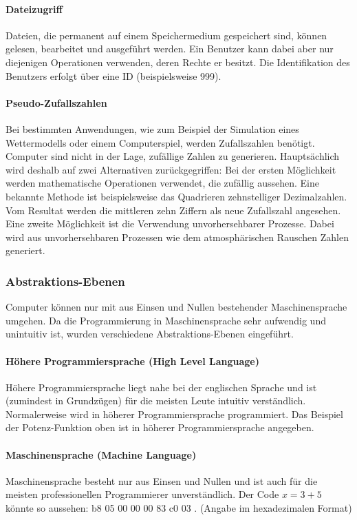 \documentclass[11pt, a4paper]{article}
\begin{document}
\paragraph{Dateizugriff}
Dateien, die permanent auf einem Speichermedium gespeichert sind, können gelesen, bearbeitet und ausgeführt werden. Ein Benutzer kann dabei aber nur diejenigen Operationen verwenden, deren Rechte er besitzt. Die Identifikation des Benutzers erfolgt über eine ID (beispielsweise 999).

\paragraph{Pseudo-Zufallszahlen}
Bei bestimmten Anwendungen, wie zum Beispiel der Simulation eines Wettermodells oder einem Computerspiel, werden Zufallszahlen benötigt. Computer sind nicht in der Lage, zufällige Zahlen zu generieren. Hauptsächlich wird deshalb auf zwei Alternativen zurückgegriffen: Bei der ersten Möglichkeit werden mathematische Operationen verwendet, die zufällig aussehen. Eine bekannte Methode ist beispielsweise das Quadrieren zehnstelliger Dezimalzahlen. Vom Resultat werden die mittleren zehn Ziffern als neue Zufallszahl angesehen. Eine zweite Möglichkeit ist die Verwendung unvorhersehbarer Prozesse. Dabei wird aus unvorhersehbaren Prozessen wie dem atmosphärischen Rauschen Zahlen generiert.~\cite{Mathemat11:online}

\subsubsection{Abstraktions-Ebenen}
Computer können nur mit aus Einsen und Nullen bestehender Maschinensprache umgehen. Da die Programmierung in Maschinensprache sehr aufwendig und unintuitiv ist, wurden verschiedene Abstraktions-Ebenen eingeführt.

\paragraph{Höhere Programmiersprache (High Level Language)}
Höhere Programmiersprache liegt nahe bei der englischen Sprache und ist (zumindest in Grundzügen) für die meisten Leute intuitiv verständlich. Normalerweise wird in höherer Programmiersprache programmiert. Das Beispiel der Potenz-Funktion oben ist in höherer Programmiersprache angegeben.
\paragraph{Maschinensprache (Machine Language)}
Maschinensprache besteht nur aus Einsen und Nullen und ist auch für die meisten professionellen Programmierer unverständlich. Der Code \(x = 3 + 5\) könnte so aussehen: 
b8 05 00 00 00
83 c0 03 
. (Angabe im hexadezimalen Format)
\end{document}

